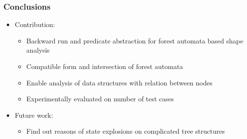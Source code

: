 \documentclass{beamer}
\newcommand{\hlgr}[1]{\textcolor{olive!50!green}{#1}}
\begin{document}


\begin{frame}
  \frametitle{Conclusions}

  \begin{itemize}
	  \item \hlgr{Contribution:}
		\begin{itemize}
			\item Backward run and predicate abstraction for forest automata based shape analysis 
			\item Compatible form and intersection of forest automata
			\item Enable analysis of data structures with relation between nodes
			\item Experimentally evaluated on number of test cases
		\end{itemize}
		\item \hlgr{Future work:}
			\begin{itemize}
				\item Find out reasons of state explosions on complicated tree structures
			\end{itemize}
  \end{itemize}
\end{frame}
\end{document}
